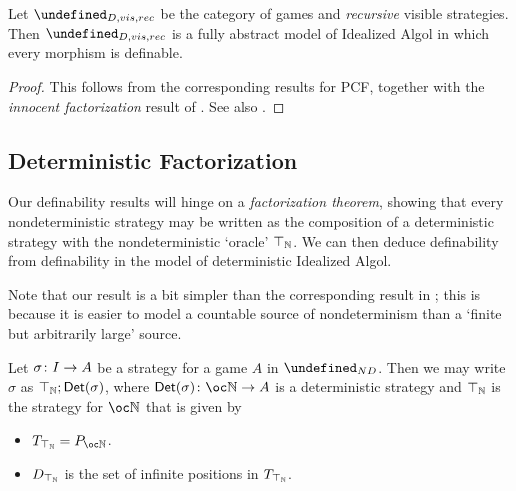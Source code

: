 \documentclass[sigplan,10pt,review]{acmart}\settopmatter{printfolios=true,printccs=false,printacmref=false}
\let\G\undefined
\begin{document}
\begin{proposition}
  Let $\G_{D,vis,rec}$ be the category of games and \emph{recursive} visible strategies.  
  Then $\G_{D,vis,rec}$ is a fully abstract model of Idealized Algol in which every morphism is definable.
\end{proposition}
\begin{proof}
  This follows from the corresponding results for PCF, together with the \emph{innocent factorization} result of \cite{SamsonGuyIAPassive}.  
  See also \cite{MurawskiUniversality}.
\end{proof}

\subsection{Deterministic Factorization}

Our definability results will hinge on a \emph{factorization theorem}, showing that every nondeterministic strategy may be written as the composition of a deterministic strategy with the nondeterministic `oracle' $\top_{\mathbb{N}}$.  
We can then deduce definability from definability in the model of deterministic Idealized Algol.

Note that our result is a bit simpler than the corresponding result in \cite{mcCHFiniteND}; this is because it is easier to model a countable source of nondeterminism than a `finite but arbitrarily large' source.

\begin{proposition}
  Let $\sigma\colon I \to A$ be a strategy for a game $A$ in $\G_{ND}$.
  Then we may write $\sigma$ as $\top_{\mathbb{N}};\mathsf{Det}(\sigma)$, where $\Det(\sigma)\from \oc\bN\to A$ is a deterministic strategy and $\top_{\mathbb{N}}$ is the strategy for $\oc\bN$ that is given by
  \begin{itemize}
    \item $T_{\top_{\bN}}=P_{\oc\bN}$.
    \item $D_{\top_{\mathbb{N}}}$ is the set of infinite positions in $T_{\top_{\mathbb{N}}}$.
  \end{itemize}
\end{proposition}
\end{document}
